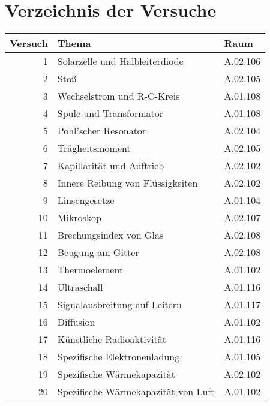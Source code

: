 
\chapter{Verzeichnis der Versuche}

\begin{table}[h!]
 \centering
 \begin{tabular}{rll}
 \hline
 Versuch & Thema & Raum\\
 \hline
 1 & Solarzelle und Halbleiterdiode & A.02.106\\ 
 2 & Stoß & A.02.105\\
 3 & Wechselstrom und R-C-Kreis & A.01.108 \\ 
 4 & Spule und Transformator & A.01.108 \\ 
 5 & Pohl'scher Resonator & A.02.104 \\
 6 & Trägheitsmoment & A.02.105\\
 7 & Kapillarität und Auftrieb & A.02.102 \\ 
 8 & Innere Reibung von Flüssigkeiten & A.02.102 \\ 
 9 & Linsengesetze & A.01.104 \\ 
 10 & Mikroskop & A.02.107 \\ 
 11 & Brechungsindex von Glas & A.02.108 \\ 
 12 & Beugung am Gitter & A.02.108\\ 
 13 & Thermoelement & A.01.102 \\ 
 14 & Ultraschall & A.01.116\\
 15 & Signalausbreitung auf Leitern & A.01.117 \\ 
 16 & Diffusion & A.01.102\\ 
 17 & Künstliche Radioaktivität & A.01.116 \\ 
 18 & Spezifische Elektronenladung & A.01.105 \\ 
 19 & Spezifische Wärmekapazität & A.02.102 \\ 
 20 & Spezifische Wärmekapazität von Luft & A.01.102 \\ 
 \hline
 \end{tabular}
\end{table}
  